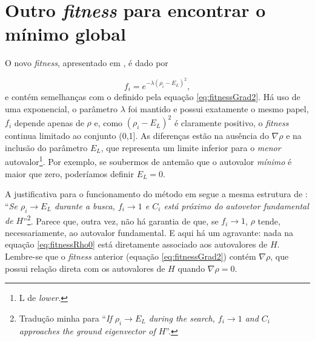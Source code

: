 \section{Outro \textit{fitness} para encontrar o mínimo global}

	O novo \emph{fitness}, apresentado em \cite{metodo2011}, é dado por
	
	\begin{equation}\label{eq:fitnessRho0}
		f_i = e^{-\lambda(\rho_i - E_L)^2},
	\end{equation}
e contém semelhanças com o definido pela equação \ref{eq:fitnessGrad2}. Há uso de uma exponencial, o parâmetro $\lambda$ foi mantido e possui exatamente o mesmo papel, $f_i$ depende apenas de $\rho$ e, como $(\rho_i - E_L)^2$ é claramente positivo, o \textit{fitness} continua limitado ao conjunto (0,1]. As diferenças estão na ausência do $\nabla \rho$ e na inclusão do parâmetro $E_L$, que representa um limite inferior para o \textit{menor} autovalor\footnote{L de \textit{lower}.}. Por exemplo, se soubermos de antemão que o autovalor \textit{mínimo} é maior que zero, poderíamos definir $E_L = 0$. 

	 A justificativa para o funcionamento do método em \cite{metodo2011} segue a mesma estrutura de \cite{metodo2004}: ``\textit{Se $\rho_i \rightarrow E_L$ durante a busca, $f_i \rightarrow 1$ e $C_i$ está próximo do autovetor fundamental de $H$}''\footnote{Tradução minha para ``\textit{If $\rho_i \rightarrow E_L$ during the search, $f_i \rightarrow 1$ and $C_i$ approaches the ground eigenvector of $H$}''.}. Parece que, outra vez, não há garantia de que, se $f_i \rightarrow 1$, $\rho$ tende, necessariamente, ao autovalor fundamental. E aqui há um agravante: nada na equação \ref{eq:fitnessRho0} está diretamente associado aos autovalores de $H$. Lembre-se que o \textit{fitness} anterior (equação \ref{eq:fitnessGrad2}) contém $\nabla \rho$, que possui relação direta com os autovalores de $H$ quando $\nabla \rho = 0$.
	
